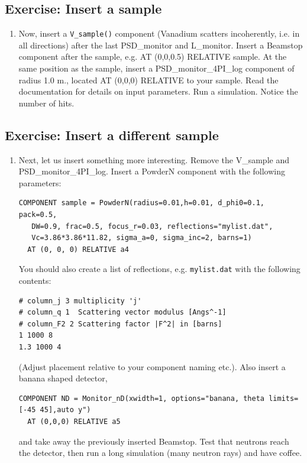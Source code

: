 \subsection{Exercise: Insert a sample}
\begin{enumerate}
\item{Now, insert a \verb+V_sample()+ component (Vanadium scatters
    incoherently, i.e. in all
    directions) after the last PSD\_monitor and L\_monitor. Insert a Beamstop component after the sample, e.g. AT
    (0,0,0.5) RELATIVE sample. 
    At the
    same position as the sample, insert a PSD\_monitor\_4PI\_log component of radius
    1.0 m., located AT (0,0,0) RELATIVE to your sample.
    Read the documentation for details on input parameters.
    Run a simulation. Notice the number of hits.}
\end{enumerate}
\subsection{Exercise: Insert a different sample}
\begin{enumerate}
\item{Next, let us insert something more interesting. Remove the
    V\_sample and  PSD\_monitor\_4PI\_log. Insert a PowderN component
    with the following parameters:
    \begin{verbatim}
COMPONENT sample = PowderN(radius=0.01,h=0.01, d_phi0=0.1, pack=0.5, 
   DW=0.9, frac=0.5, focus_r=0.03, reflections="mylist.dat",
   Vc=3.86*3.86*11.82, sigma_a=0, sigma_inc=2, barns=1)
  AT (0, 0, 0) RELATIVE a4
\end{verbatim}
You should also create a list of reflections, e.g. \texttt{mylist.dat}
with the following contents:
\begin{verbatim}
# column_j 3 multiplicity 'j'
# column_q 1  Scattering vector modulus [Angs^-1]
# column_F2 2 Scattering factor |F^2| in [barns]
1 1000 8
1.3 1000 4
\end{verbatim}

(Adjust placement relative to your component naming etc.). Also insert
  a banana shaped detector,
\begin{verbatim}
COMPONENT ND = Monitor_nD(xwidth=1, options="banana, theta limits=[-45 45],auto y")
  AT (0,0,0) RELATIVE a5
\end{verbatim}
and take away the previously inserted Beamstop. Test that neutrons
reach the detector, then run a long simulation (many neutron rays) and have coffee.}
\end{enumerate}
